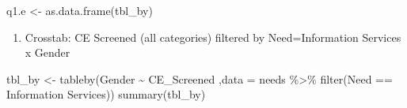 \documentclass[
]{article}
\newenvironment{Shaded}{\begin{snugshade}}{\end{snugshade}}
\newcommand{\AttributeTok}[1]{\textcolor[rgb]{0.77,0.63,0.00}{#1}}
\newcommand{\FunctionTok}[1]{\textcolor[rgb]{0.00,0.00,0.00}{#1}}
\newcommand{\NormalTok}[1]{#1}
\newcommand{\OtherTok}[1]{\textcolor[rgb]{0.56,0.35,0.01}{#1}}
\newcommand{\SpecialCharTok}[1]{\textcolor[rgb]{0.00,0.00,0.00}{#1}}
\newcommand{\StringTok}[1]{\textcolor[rgb]{0.31,0.60,0.02}{#1}}
\providecommand{\tightlist}{%
  \setlength{\itemsep}{0pt}\setlength{\parskip}{0pt}}
\begin{document}
\begin{Shaded}
\begin{Highlighting}[]
\NormalTok{q1.e }\OtherTok{\textless{}{-}} \FunctionTok{as.data.frame}\NormalTok{(tbl\_by)}
\end{Highlighting}
\end{Shaded}

\begin{enumerate}
\def\labelenumi{\alph{enumi}.}
\setcounter{enumi}{5}
\tightlist
\item
  Crosstab: CE Screened (all categories) filtered by Need=Information
  Services x Gender
\end{enumerate}

\begin{Shaded}
\begin{Highlighting}[]
\NormalTok{tbl\_by }\OtherTok{\textless{}{-}} \FunctionTok{tableby}\NormalTok{(Gender }\SpecialCharTok{\textasciitilde{}}\NormalTok{ CE\_Screened ,}\AttributeTok{data =}\NormalTok{ needs }\SpecialCharTok{\%\textgreater{}\%} \FunctionTok{filter}\NormalTok{(Need }\SpecialCharTok{==} \StringTok{\textquotesingle{}Information Services\textquotesingle{}}\NormalTok{))}
\FunctionTok{summary}\NormalTok{(tbl\_by)}
\end{Highlighting}
\end{Shaded}
\end{document}
